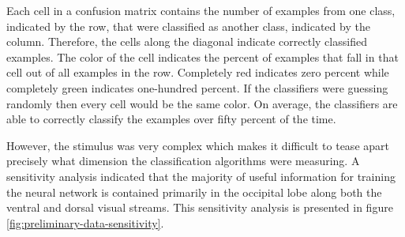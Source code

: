 \documentclass[12pt]{article}
\begin{document}
Each cell in a confusion matrix contains the number of examples from one class, indicated by the row, that were classified as another class, indicated by the column.
Therefore, the cells along the diagonal indicate correctly classified examples.
The color of the cell indicates the percent of examples that fall in that cell out of all examples in the row.
Completely red indicates zero percent while completely green indicates one-hundred percent.
If the classifiers were guessing randomly then every cell would be the same color.
On average, the classifiers are able to correctly classify the examples over fifty percent of the time.

However, the stimulus was very complex which makes it difficult to tease apart precisely what dimension the classification algorithms were measuring.
A sensitivity analysis indicated that the majority of useful information for training the neural network is contained primarily in the occipital lobe along both the ventral and dorsal visual streams.
This sensitivity analysis is presented in figure \ref{fig:preliminary-data-sensitivity}.
\end{document}
